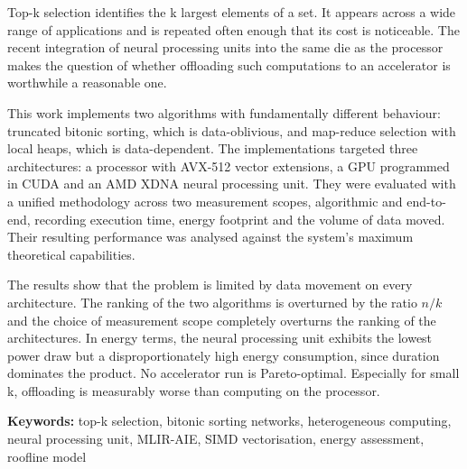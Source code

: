 Top-k selection identifies the k largest elements of a set. It appears across a
wide range of applications and is repeated often enough that its cost is
noticeable. The recent integration of neural processing units into the same die
as the processor makes the question of whether offloading such computations to
an accelerator is worthwhile a reasonable one.

This work implements two algorithms with fundamentally different behaviour:
truncated bitonic sorting, which is data-oblivious, and map-reduce selection
with local heaps, which is data-dependent. The implementations targeted three
architectures: a processor with AVX-512 vector extensions, a GPU programmed in
CUDA and an AMD XDNA neural processing unit. They were evaluated with a unified
methodology across two measurement scopes, algorithmic and end-to-end,
recording execution time, energy footprint and the volume of data moved. Their
resulting performance was analysed against the system's maximum theoretical
capabilities.

The results show that the problem is limited by data movement on every
architecture. The ranking of the two algorithms is overturned by the ratio
$n/k$ and the choice of measurement scope completely overturns the ranking of
the architectures. In energy terms, the neural processing unit exhibits the
lowest power draw but a disproportionately high energy consumption, since
duration dominates the product. No accelerator run is Pareto-optimal.
Especially for small k, offloading is measurably worse than computing on the
processor.

\vspace{1em}

\textbf{Keywords:} top-k selection, bitonic sorting networks, heterogeneous
computing, neural processing unit, MLIR-AIE, SIMD vectorisation, energy
assessment, roofline model

